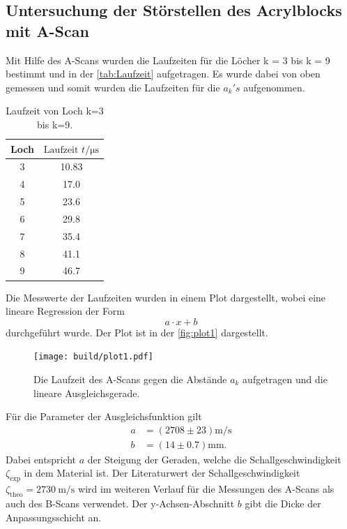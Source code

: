 \subsection{Untersuchung der Störstellen des Acrylblocks mit A-Scan}
\label{Untersuchung der Störstellen des Aceylblocks mit A-Scan}
Mit Hilfe des A-Scans wurden die Laufzeiten für die Löcher k = 3 bis k = 9 bestimmt und in der 
\autoref{tab:Laufzeit} aufgetragen. Es wurde dabei von oben gemessen und somit wurden die Laufzeiten für die
$a_k's$ aufgenommen. 
\begin{table}[H]
    \centering
    \caption{Laufzeit von Loch k=3 bis k=9.}
    \label{tab:Laufzeit}
\begin{tabular}{c c}
    \toprule
    Loch & $\text{Laufzeit } t / \si{\micro\second} $\\
    \midrule
     3 & 10.83 \\
     4 &  17.0 \\
     5 &  23.6 \\
     6 &  29.8 \\
     7 &  35.4 \\
     8 &  41.1 \\
     9 &  46.7 \\
    \bottomrule
\end{tabular}
\end{table}
Die Messwerte der Laufzeiten wurden in einem Plot dargestellt, wobei eine lineare Regression der Form 
\begin{equation*}
    a \cdot x + b
\end{equation*}
durchgeführt wurde. Der Plot ist in der \autoref{fig:plot1} dargestellt.

\begin{figure}[H]
	\texttt{[image: build/plot1.pdf]}
	\captionsetup{width=0.765\linewidth}
	\caption{Die Laufzeit des A-Scans gegen die Abstände $a_k$ aufgetragen und die lineare Ausgleichsgerade.}
	\label{fig:plot1}
\end{figure}

Für die Parameter der Ausgleichsfunktion gilt
\begin{align*}
    a &= \left(2708 \pm 23\right) \si{\meter \per \second}\\
    b &= \left(14 \pm 0.7\right) \si{\milli\meter}.
\end{align*}
Dabei entspricht $a$ der Steigung der Geraden, welche die Schallgeschwindigkeit $\zeta_{\text{exp}}$ in dem Material ist.
Der Literaturwert der Schallgeschwindigkeit $\zeta_{\text{theo}} = \SI{2730}{\meter\per\second}$ wird im weiteren Verlauf für die 
Messungen des A-Scans als auch des B-Scans verwendet.
Der y-Achsen-Abschnitt $b$ gibt die Dicke der Anpassungsschicht an. 

